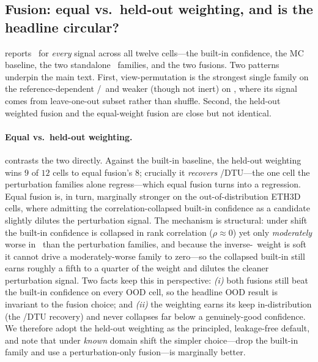\subsection{Fusion: equal vs.\ held-out weighting, and is the headline circular?}
\label{sec:abl-fusion}

 reports \ause\ for \emph{every} signal across all twelve cells---the built-in
confidence, the MC baseline, the two standalone \trustr\ families, and the two fusions. Two patterns underpin the main
text. First, view-permutation is the strongest single family on the reference-dependent \vggt/\mastr\
and weaker (though not inert) on \pii, where its signal comes from leave-one-out subset rather than
shuffle. Second, the held-out weighted fusion and the equal-weight fusion are close but not identical.

\begin{table}[tb]
\centering\small
{}
\caption{Per-signal \ause\dn\ (mean over 3 seeds) for all 12 cells. Columns: built-in confidence;
MC/latent-noise baseline; the two standalone \trustr\ families (photometric, view-perm); and the
equal-weight and held-out-weighted fusions. \best{Bold} marks the best (lowest) signal in each row.}
\label{tab:allsig}
\end{table}

\paragraph{Equal vs.\ held-out weighting.}  contrasts the two directly. Against the
built-in baseline, the held-out weighting wins $9$ of $12$ cells to equal fusion's $8$; crucially it
\emph{recovers} \pii/DTU---the one cell the perturbation families alone regress---which equal fusion
turns into a regression. Equal fusion is, in turn, marginally stronger on the out-of-distribution
ETH3D cells, where admitting the correlation-collapsed built-in confidence as a candidate slightly
dilutes the perturbation signal. The mechanism is structural: under shift the built-in confidence is
collapsed in rank correlation ($\rho\approx 0$) yet only \emph{moderately} worse in \ause\ than the
perturbation families, and because the inverse-\ause\ weight is soft it cannot drive a moderately-worse
family to zero---so the collapsed built-in still earns roughly a fifth to a quarter of the weight and
dilutes the cleaner perturbation signal. Two facts keep this in perspective: \emph{(i)} both fusions
still beat the built-in confidence on every OOD cell, so the headline OOD result is invariant to the
fusion choice; and \emph{(ii)} the weighting earns its keep in-distribution (the \pii/DTU recovery)
and never collapses far below a genuinely-good confidence. We therefore adopt the held-out weighting
as the principled, leakage-free default, and note that under \emph{known} domain shift the simpler
choice---drop the built-in family and use a perturbation-only fusion---is marginally better.

